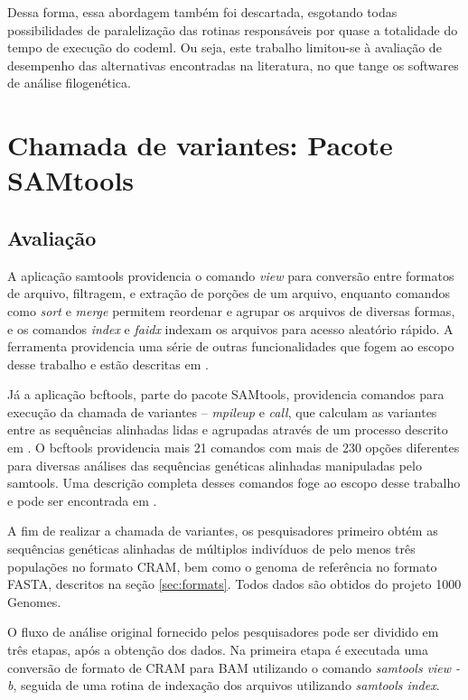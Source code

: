 \documentclass[cic,tc]{iiufrgs}
\begin{document}
Dessa forma, essa abordagem também foi descartada, esgotando todas
possibilidades de paralelização das rotinas responsáveis por quase a totalidade
do tempo de execução do codeml. Ou seja, este trabalho limitou-se à avaliação
de desempenho das alternativas encontradas na literatura, no que tange os
softwares de análise filogenética.

\section{Chamada de variantes: Pacote SAMtools}
\label{sec:SAMtools}

\subsection{Avaliação}

A aplicação samtools providencia o comando \textit{view} para conversão entre
formatos de arquivo, filtragem, e extração de porções de um arquivo, enquanto
comandos como \textit{sort} e \textit{merge} permitem reordenar e agrupar os
arquivos de diversas formas, e os comandos \textit{index} e \textit{faidx}
indexam os arquivos para acesso aleatório rápido. A ferramenta providencia uma
série de outras funcionalidades que fogem ao escopo desse trabalho e estão
descritas em \cite{danecek2021twelve}.

Já a aplicação bcftools, parte do pacote SAMtools, providencia comandos para
execução da chamada de variantes -- \textit{mpileup} e \textit{call}, que
calculam as variantes entre as sequências alinhadas lidas e agrupadas através
de um processo descrito em \cite{li2011improving}. O bcftools providencia mais
21 comandos com mais de 230 opções diferentes para diversas análises das
sequências genéticas alinhadas manipuladas pelo samtools. Uma descrição
completa desses comandos foge ao escopo desse trabalho e pode ser encontrada em
\cite{danecek2021twelve}.

A fim de realizar a chamada de variantes, os pesquisadores primeiro obtém as
sequências genéticas alinhadas de múltiplos indivíduos de pelo menos três
populações no formato CRAM, bem como o genoma de referência no formato FASTA,
descritos na seção \ref{sec:formats}. Todos dados são obtidos do projeto 1000
Genomes.

O fluxo de análise original fornecido pelos pesquisadores pode ser dividido em
três etapas, após a obtenção dos dados. Na primeira etapa é executada uma
conversão de formato de CRAM para BAM utilizando o comando \textit{samtools
view -b}, seguida de uma rotina de indexação dos arquivos utilizando
\textit{samtools index}.
\end{document}
